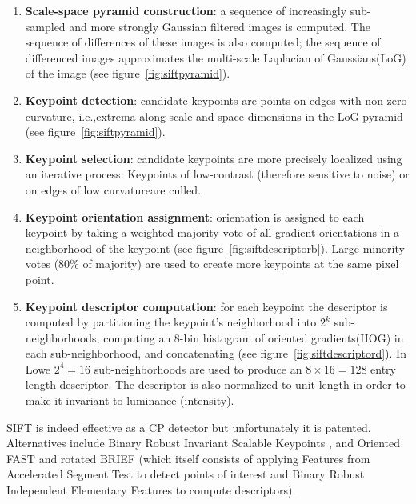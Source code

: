 \begin{framed}
	\begin{enumerate}
		\item \textbf{Scale-space pyramid construction}: a sequence of increasingly sub-sampled and more strongly Gaussian filtered images is computed. The sequence of differences of these images is also computed; the sequence of differenced images approximates the multi-scale Laplacian of Gaussians\footnotemark (LoG) of the image (see figure~\ref{fig:siftpyramid}).
		\item \textbf{Keypoint detection}: candidate keypoints are points on edges with non-zero curvature, i.e.,extrema along scale and space dimensions in the LoG pyramid (see figure~\ref{fig:siftpyramid}).
		\item \textbf{Keypoint selection}: candidate keypoints are more precisely localized using an iterative process. Keypoints of low-contrast (therefore sensitive to noise) or on edges of low curvature\footnotemark are culled.
		\item \textbf{Keypoint orientation assignment}: orientation is assigned to each keypoint by taking a weighted majority vote of all gradient orientations in a neighborhood of the keypoint (see figure~\ref{fig:siftdescriptorb}). Large minority votes (80\% of majority) are used to create more keypoints at the same pixel point.
		\item \textbf{Keypoint descriptor computation}: for each keypoint the descriptor is computed by partitioning the keypoint's neighborhood into \(2^k\) sub-neighborhoods, computing an 8-bin histogram of oriented gradients\footnotemark (HOG) in each sub-neighborhood, and concatenating (see figure~\ref{fig:siftdescriptord}). In Lowe \etal \cite{lowe2004distinctive} \(2^4=16\) sub-neighborhoods are used to produce an \(8\times16 = 128\) entry length descriptor. The descriptor is also normalized to unit length in order to make it invariant to luminance (intensity).
	\end{enumerate}
\end{framed}
\addtocounter{footnote}{-3}
{
	\makeatletter
	\renewcommand\@makefnmark{\hbox{\@textsuperscript{\normalfont\color{white}\@thefnmark}}}
	\renewcommand\@makefntext[1]{%
	  \parindent 1em\noindent
				\hb@xt@1.8em{%
					\hss\@textsuperscript{\normalfont\@thefnmark}}#1}
	\makeatother

}

SIFT is indeed effective as a CP detector but unfortunately it is patented.
%
Alternatives include Binary Robust Invariant Scalable Keypoints \cite{leutenegger2011brisk}, and Oriented FAST and rotated BRIEF \cite{rublee2011orb} (which itself consists of applying Features from Accelerated Segment Test \cite{rosten2006machine} to detect points of interest and Binary Robust Independent Elementary Features \cite{calonder2010brief} to compute descriptors).

